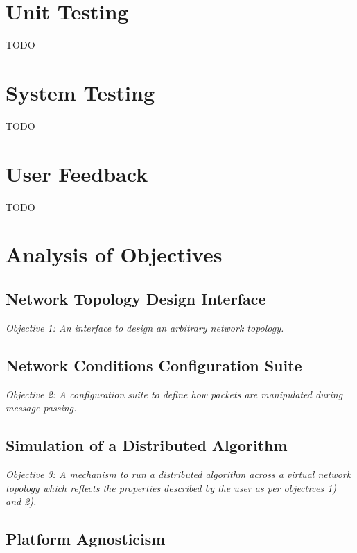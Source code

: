 \section{Unit Testing}\label{section:unit_testing}

TODO


\section{System Testing}\label{section:system_testing}

TODO


\section{User Feedback}\label{section:user_feedback}

TODO


\section{Analysis of Objectives}\label{section:analysis_of_objectives}

\subsection{Network Topology Design Interface}\label{subsection:network_topology_design_interface}

\emph{Objective 1: An interface to design an arbitrary network topology.}

\subsection{Network Conditions Configuration Suite}\label{subsection:network_conditions_configuration_suite }

\emph{Objective 2: A configuration suite to define how packets are manipulated during message-passing.}

\subsection{Simulation of a Distributed Algorithm}\label{subsection:simulation_of_a_distributed_algorithm}

\emph{Objective 3: A mechanism to run a distributed algorithm across a virtual network topology which reflects the
properties described by the user as per objectives 1) and 2).}

\subsection{Platform Agnosticism}\label{subsection:platform_agnosticism}


